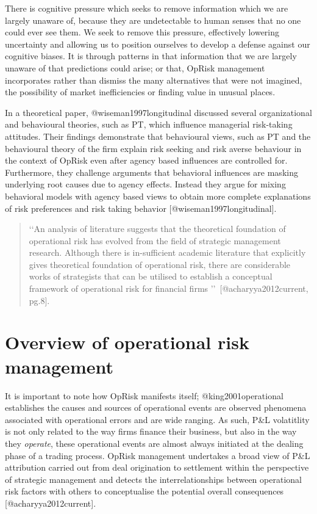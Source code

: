 \documentclass[]{article}
\begin{document}
There is cognitive pressure which seeks to remove information which we
are largely unaware of, because they are undetectable to human senses
that no one could ever see them. We seek to remove this pressure,
effectively lowering uncertainty and allowing us to position ourselves
to develop a defense against our cognitive biases. It is through
patterns in that information that we are largely unaware of that
predictions could arise; or that, OpRisk management incorporates rather
than dismiss the many alternatives that were not imagined, the
possibility of market inefficiencies or finding value in unusual places.
\medskip

In a theoretical paper, @wiseman1997longitudinal discussed several
organizational and behavioural theories, such as PT, which influence
managerial risk-taking attitudes. Their findings demonstrate that
behavioural views, such as PT and the behavioural theory of the firm
explain risk seeking and risk averse behaviour in the context of OpRisk
even after agency based influences are controlled for. Furthermore, they
challenge arguments that behavioral influences are masking underlying
root causes due to agency effects. Instead they argue for mixing
behavioral models with agency based views to obtain more complete
explanations of risk preferences and risk taking behavior
{[}@wiseman1997longitudinal{]}. \medskip 

\begin{quote}
 \lq\lq An analysis of literature suggests that the theoretical foundation of operational risk has evolved from the field of strategic management research. Although there is in-sufficient academic literature that explicitly gives theoretical foundation of operational risk, there are considerable works of strategists that can be utilised to establish a conceptual framework of operational risk for financial firms \rq\rq\ [@acharyya2012current, pg.8].
\end{quote}

\section{Overview of operational risk management}
\label{sec:Overview of operational risk management}

It is important to note how OpRisk manifests itself;
@king2001operational establishes the causes and sources of operational
events are observed phenomena associated with operational errors and are
wide ranging. As such, P\&L volatitlity is not only related to the way
firms finance their business, but also in the way they \emph{operate},
these operational events are almost always initiated at the dealing
phase of a trading process. OpRisk management undertakes a broad view of
P\&L attribution carried out from deal origination to settlement within
the perspective of strategic management and detects the
interrelationships between operational risk factors with others to
conceptualise the potential overall consequences
{[}@acharyya2012current{]}.\medskip
\end{document}

